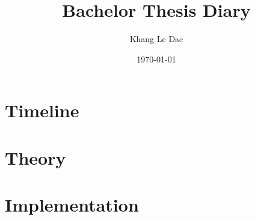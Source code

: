 \documentclass[a4paper,11pt]{scrartcl}
\title{Bachelor Thesis Diary}
\author{Khang Le Dac}
\date{\today}
\begin{document}
\maketitle

\section{Timeline}
\label{sec:timeline}


\section{Theory}
\label{sec:theory}


\section{Implementation}
\label{sec:implementation}

\end{document}
